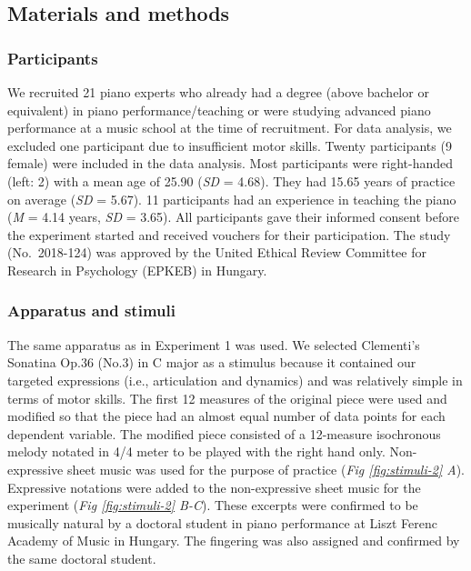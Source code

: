 \documentclass[
  man,floatsintext]{apa6}
\begin{document}
\hypertarget{materials-and-methods-1}{%
\subsection{Materials and methods}\label{materials-and-methods-1}}

\hypertarget{participants-1}{%
\subsubsection{Participants}\label{participants-1}}

We recruited 21 piano experts who already had a degree (above bachelor or equivalent) in piano performance/teaching or were studying advanced piano performance at a music school at the time of recruitment. For data analysis, we excluded one participant due to insufficient motor skills. Twenty participants (9 female) were included in the data analysis. Most participants were right-handed (left: 2) with a mean age of 25.90 (\emph{SD} = 4.68). They had 15.65 years of practice on average (\emph{SD} = 5.67). 11 participants had an experience in teaching the piano (\emph{M} = 4.14 years, \emph{SD} = 3.65). All participants gave their informed consent before the experiment started and received vouchers for their participation. The study (No.~2018-124) was approved by the United Ethical Review Committee for Research in Psychology (EPKEB) in Hungary.

\hypertarget{apparatus-and-stimuli-1}{%
\subsubsection{Apparatus and stimuli}\label{apparatus-and-stimuli-1}}

The same apparatus as in Experiment 1 was used. We selected Clementi's Sonatina Op.36 (No.3) in C major as a stimulus because it contained our targeted expressions (i.e., articulation and dynamics) and was relatively simple in terms of motor skills. The first 12 measures of the original piece were used and modified so that the piece had an almost equal number of data points for each dependent variable. The modified piece consisted of a 12-measure isochronous melody notated in 4/4 meter to be played with the right hand only. Non-expressive sheet music was used for the purpose of practice (\emph{Fig \ref{fig:stimuli-2} A}). Expressive notations were added to the non-expressive sheet music for the experiment (\emph{Fig \ref{fig:stimuli-2} B-C}). These excerpts were confirmed to be musically natural by a doctoral student in piano performance at Liszt Ferenc Academy of Music in Hungary. The fingering was also assigned and confirmed by the same doctoral student.
\end{document}
